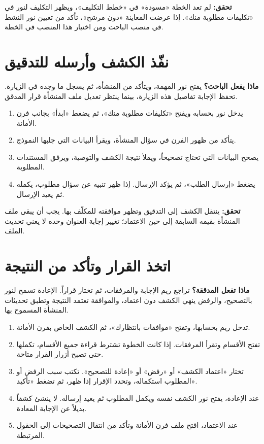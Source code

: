 \textbf{تحقق:} لم تعد الخطة «مسودة» في «خطط التكليف»، ويظهر التكليف لنور في «تكليفات مطلوبة منك». إذا عرضت المعاينة «دون مرشح»، تأكد من تعيين نور النشط في منصب الباحث ومن اختيار هذا المنصب في الخطة.

\section{نفّذ الكشف وأرسله للتدقيق}
\label{sec:build-run}

\textbf{ماذا يفعل الباحث؟} يفتح نور المهمة، ويتأكد من المنشأة، ثم يسجل ما وجده في الزيارة. تحفظ الإجابة تفاصيل هذه الزيارة، بينما ينتظر تعديل ملف المنشأة قرار المدقق.

\begin{enumerate}
\item يدخل نور بحسابه ويفتح «تكليفات مطلوبة منك»، ثم يضغط «ابدأ» بجانب فرن الأمانة.
\item يتأكد من ظهور الفرن في سؤال المنشأة، ويقرأ البيانات التي جلبها النموذج.
\item يصحح البيانات التي تحتاج تصحيحاً، ويملأ نتيجة الكشف والتوصية، ويرفق المستندات المطلوبة.
\item يضغط «إرسال الطلب»، ثم يؤكد الإرسال. إذا ظهر تنبيه عن سؤال مطلوب، يكمله ثم يعيد الإرسال.
\end{enumerate}

\textbf{تحقق:} ينتقل الكشف إلى التدقيق وتظهر موافقته للمكلّف بها. يجب أن يبقى ملف المنشأة بقيمه السابقة إلى حين الاعتماد؛ تغيير إجابة العنوان وحده لا يعني تحديث الملف.

\section{اتخذ القرار وتأكد من النتيجة}
\label{sec:build-decision}

\textbf{ماذا تفعل المدققة؟} تراجع ريم الإجابة والمرفقات، ثم تختار قراراً. الإعادة تسمح لنور بالتصحيح، والرفض ينهي الكشف دون اعتماد، والموافقة تعتمد النتيجة وتطبق تحديثات المنشأة المسموح بها.

\begin{enumerate}
\item تدخل ريم بحسابها، وتفتح «موافقات بانتظارك»، ثم الكشف الخاص بفرن الأمانة.
\item تفتح الأقسام وتقرأ المرفقات. إذا كانت الخطوة تشترط قراءة جميع الأقسام، تكملها حتى تصبح أزرار القرار متاحة.
\item تختار «اعتماد الكشف» أو «رفض» أو «إعادة للتصحيح». تكتب سبب الرفض أو المطلوب استكماله، وتحدد الإقرار إذا ظهر، ثم تضغط «تأكيد».
\item عند الإعادة، يفتح نور الكشف نفسه ويكمل المطلوب ثم يعيد إرساله. لا ينشئ كشفاً بديلاً عن الإجابة المعادة.
\item عند الاعتماد، افتح ملف فرن الأمانة وتأكد من انتقال التصحيحات إلى الحقول المرتبطة.
\end{enumerate}

